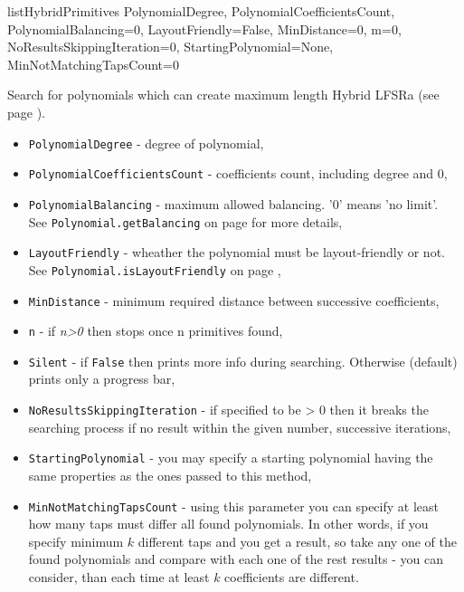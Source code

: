  {listHybridPrimitives} {PolynomialDegree, PolynomialCoefficientsCount,\\PolynomialBalancing=0, LayoutFriendly=False, MinDistance=0, m=0,\\NoResultsSkippingIteration=0, StartingPolynomial=None, MinNotMatchingTapsCount=0} {
	Search for polynomials which can create maximum length Hybrid LFSRa (see page \pageref{lfsr:hybrid}).
	\begin{itemize}
		\item \texttt{PolynomialDegree} - degree of polynomial,
		\item \texttt{PolynomialCoefficientsCount} - coefficients count, including degree and 0,
		\item \texttt{PolynomialBalancing} - maximum allowed balancing. '0' means 'no limit'. \\See \texttt{Polynomial.getBalancing} on page \pageref{polynomial:getbalancing} for more details,
		\item \texttt{LayoutFriendly} - wheather the polynomial must be layout-friendly or not. \\See \texttt{Polynomial.isLayoutFriendly} on page \pageref{polynomial:islayoutfriendly},
		\item \texttt{MinDistance} - minimum required distance between successive coefficients,
		\item \texttt{n} - if \textit{n>0} then stops once n primitives found,
		\item \texttt{Silent} - if \texttt{False} then prints more info during searching. Otherwise (default) prints only a progress bar,
		\item \texttt{NoResultsSkippingIteration} - if specified to be > 0 then it breaks the searching process if no result within the given number, successive iterations,
		\item \texttt{StartingPolynomial} - you may specify a starting polynomial having the same properties as the ones passed to this method,
		\item \texttt{MinNotMatchingTapsCount} - using this parameter you can specify at least how many taps must differ all found polynomials. In other words, if you specify minimum $k$ different taps and you get a result, so take any one of the found polynomials and compare with each one of the rest results - you can consider, than each time at least $k$ coefficients are different.
	\end{itemize}
}

